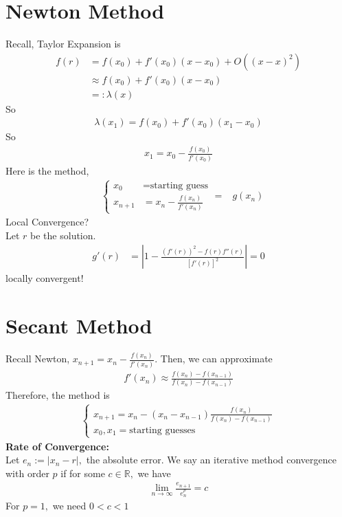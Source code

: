 \documentclass[11pt,oneside]{book}
\theoremstyle{break}
\theoremstyle{break}
\newcommand{\R}{\mathbb{R}}
\begin{document}
\section[Newton Method]{Newton Method}
Recall, Taylor Expansion is \begin{align*}
f(r)&=f(x_0)+f'(x_0)(x-x_0)+O((x-x)^2)\\
&\approx f(x_0)+f'(x_0)(x-x_0)\\
&=: \lambda(x)
\end{align*}
So \begin{align*}
\lambda(x_1)=f(x_0)+f'(x_0)(x_1-x_0)
\end{align*}
So \begin{align*}
x_1=x_0-\frac{f(x_0)}{f'(x_0)}
\end{align*}
Here is the method, \begin{align*}
&\begin{cases}
x_0&=\text{starting guess}\\
x_{n+1}&=x_n-\frac{f(x_n)}{f'(x_n)}
\end{cases}
=&g(x_n)
\end{align*}
Local Convergence?\\
Let $r$ be the solution.\begin{align*}
g'(r)&=\left|1-\frac{(f'(r))^2-f(r)f''(r)}{[f'(r)]^2}\right|=0
\end{align*}
locally convergent!
\section[Secant Method]{Secant Method}
Recall Newton, $x_{n+1}=x_n-\frac{f(x_n)}{f'(x_n)}$. Then, we can approximate \begin{align*}
f'(x_n)\approx \frac{f(x_n)-f(x_{n-1})}{f(x_n)-f(x_{n-1})}
\end{align*}
Therefore, the method is \begin{align*}
\begin{cases}
x_{n+1}=x_n-(x_n-x_{n-1})\frac{f(x_n)}{f(x_n)-f(x_{n-1})}\\
x_0,x_1=\text{starting guesses}
\end{cases}
\end{align*}
\textbf{Rate of Convergence:}\\
Let $e_n:=|x_n-r|,$ the absolute error. We say an iterative method convergence with order $p$ if for some $c\in \R,$ we have \begin{align*}
\lim_{n\to \infty}\frac{e_{n+1}}{e_n^p}=c
\end{align*}
For $p=1,$ we need $0<c<1$
\end{document}
